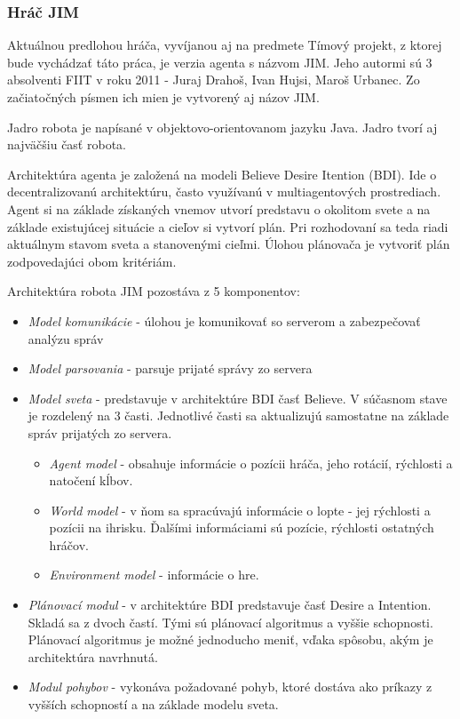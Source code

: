 \subsubsection{Hráč JIM}
	\label{jim}
Aktuálnou predlohou hráča, vyvíjanou aj na predmete Tímový projekt, z ktorej bude vychádzať táto práca, je verzia agenta s názvom JIM. Jeho autormi sú 3 absolventi FIIT v roku 2011 - Juraj Drahoš, Ivan Hujsi, Maroš Urbanec. Zo začiatočných písmen ich mien je vytvorený aj názov JIM.

Jadro robota je napísané v objektovo-orientovanom jazyku Java. Jadro tvorí aj najväčšiu časť robota. %

Architektúra agenta je založená na modeli Believe Desire Itention (BDI). Ide o decentralizovanú architektúru, často využívanú v multiagentových prostrediach. Agent  si  na  základe  získaných  vnemov  utvorí  predstavu  o  okolitom   svete  a  na  základe existujúcej  situácie  a  cieľov  si  vytvorí  plán.  Pri  rozhodovaní  sa  teda  riadi  aktuálnym stavom  sveta  a stanovenými  cieľmi.  Úlohou  plánovača je  vytvoriť  plán  zodpovedajúci  obom kritériám.

Architektúra robota JIM pozostáva z 5 komponentov:

\begin{itemize}
	\item \textit{Model komunikácie} - úlohou je komunikovať so serverom a zabezpečovať analýzu správ
	\item \textit{Model parsovania} - parsuje prijaté správy zo servera
	\item \textit{Model sveta} - predstavuje v architektúre BDI časť Believe. V súčasnom stave je rozdelený na 3 časti. Jednotlivé časti sa aktualizujú samostatne na základe správ prijatých zo servera.
		\begin{itemize}
			\item \textit{Agent model} - obsahuje informácie o pozícii hráča, jeho rotácií, rýchlosti a natočení kĺbov.
			\item \textit{World model} - v ňom sa spracúvajú informácie o lopte - jej rýchlosti a pozícii na ihrisku. Ďalšími informáciami sú pozície, rýchlosti ostatných hráčov.
			\item \textit{Environment model} - informácie o hre.
		\end{itemize}
	\item \textit{Plánovací modul} - v architektúre BDI predstavuje časť Desire a Intention. Skladá sa z dvoch častí. Tými sú plánovací algoritmus a vyššie schopnosti. Plánovací algoritmus je možné jednoducho meniť, vďaka spôsobu, akým je architektúra navrhnutá.
	\item \textit{Modul pohybov} - vykonáva požadované pohyb, ktoré dostáva ako príkazy z vyšších schopností a na základe modelu sveta.
\end{itemize}

